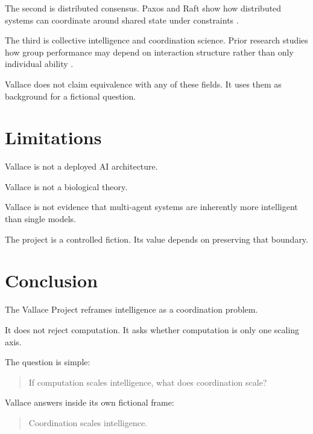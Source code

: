 \documentclass[11pt]{article}
\begin{document}
The second is distributed consensus. Paxos and Raft show how distributed
systems can coordinate around shared state under constraints
\cite{lamport1998part,ongaro2014search}.

The third is collective intelligence and coordination science. Prior research
studies how group performance may depend on interaction structure rather than
only individual ability \cite{woolley2010evidence,malone1994interdisciplinary}.

Vallace does not claim equivalence with any of these fields. It uses them as
background for a fictional question.

\section{Limitations}

Vallace is not a deployed AI architecture.

Vallace is not a biological theory.

Vallace is not evidence that multi-agent systems are inherently more
intelligent than single models.

The project is a controlled fiction. Its value depends on preserving that
boundary.

\section{Conclusion}

The Vallace Project reframes intelligence as a coordination problem.

It does not reject computation. It asks whether computation is only one scaling
axis.

The question is simple:

\begin{quote}
If computation scales intelligence, what does coordination scale?
\end{quote}

Vallace answers inside its own fictional frame:

\begin{quote}
Coordination scales intelligence.
\end{quote}



\end{document}
